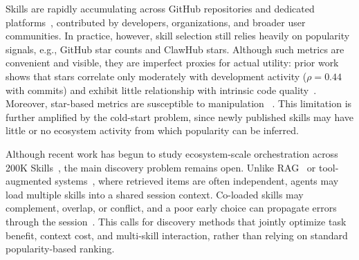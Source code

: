 \documentclass[sigconf,nonacm]{acmart}
\begin{document}
Skills are rapidly accumulating across GitHub repositories and dedicated platforms~\cite{langskills,skillsmp,skillsrest,clawhub}, contributed by developers, organizations, and broader user communities. In practice, however, skill selection still relies heavily on popularity signals, e.g., GitHub star counts and ClawHub stars. Although such metrics are convenient and visible, they are imperfect proxies for actual utility: prior work shows that stars correlate only moderately with development activity ($\rho = 0.44$ with commits) and exhibit little  relationship with intrinsic code quality~\cite{borges2018stars, sajnani2014popularity}. Moreover, star-based metrics are susceptible to manipulation %
~\cite{he2026fakestars}. This limitation is further amplified by the cold-start problem, since newly published skills may have little or no ecosystem activity from which popularity can be inferred.

Although recent work has begun to study ecosystem-scale orchestration across 200K Skills~\cite{agentskillos2026}, the main discovery problem remains open. Unlike RAG~\cite{lewis2020rag} or tool-augmented systems~\cite{schick2023toolformer}, where retrieved items are often independent, agents may load multiple skills into a shared session context. Co-loaded skills may complement, overlap, or conflict, and a poor early choice can propagate errors through the session~\cite{furuta2024compwob}.
This calls for discovery methods that jointly optimize task benefit, context cost, and multi-skill interaction, rather than relying on standard popularity-based ranking.


\end{document}
